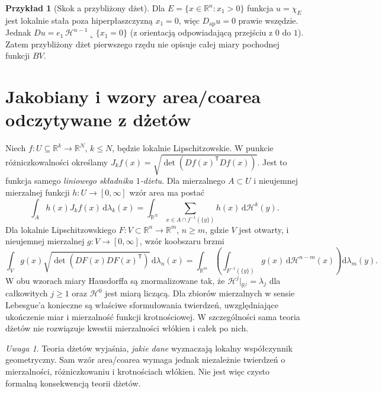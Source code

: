 \documentclass[11pt,a4paper,oneside]{book}
\numberwithin{equation}{chapter}
\theoremstyle{plain}
\theoremstyle{definition}
\newtheorem{przyklad}[twierdzenie]{Przykład}
\theoremstyle{remark}
\newtheorem{uwaga}[twierdzenie]{Uwaga}
\begin{document}
\begin{przyklad}[Skok a przybliżony dżet]
Dla $E=\{x\in\mathbb R^n:x_1>0\}$ funkcja
$u=\chi_E$ jest lokalnie stała poza hiperpłaszczyzną
$x_1=0$, więc $D_{\mathrm{ap}}u=0$ prawie wszędzie.
Jednak $Du=e_1\,\mathcal H^{n-1}\llcorner\{x_1=0\}$
(z orientacją odpowiadającą przejściu z $0$ do $1$).
Zatem przybliżony dżet pierwszego rzędu nie opisuje
całej miary pochodnej funkcji $BV$.
\end{przyklad}

\section{Jakobiany i wzory area/coarea odczytywane z dżetów}
Niech $f:U\subseteq\mathbb R^k\to\mathbb R^N$,
$k\le N$, będzie lokalnie Lipschitzowskie.
W punkcie różniczkowalności określamy
$J_kf(x)=\sqrt{\det(Df(x)^{\mathsf T}Df(x))}$.
Jest to funkcja samego \emph{liniowego składnika $1$-dżetu}.
Dla mierzalnego $A\subset U$ i nieujemnej
mierzalnej funkcji $h:U\to[0,\infty]$ wzór area ma postać
\[
 \int_A h(x)J_kf(x)\,\mathrm d\lambda_k(x)
 =\int_{\mathbb R^N}\sum_{x\in A\cap f^{-1}(\{y\})}
 h(x)\,\mathrm d\mathcal H^k(y).
\]
Dla lokalnie Lipschitzowskiego $F:V\subset\mathbb R^n\to
\mathbb R^m$, $n\ge m$, gdzie $V$ jest otwarty,
i nieujemnej mierzalnej $g:V\to[0,\infty]$, wzór
koobszaru brzmi
\[
 \int_V g(x)\sqrt{\det(DF(x)DF(x)^{\mathsf T})}
 \,\mathrm d\lambda_n(x)
 =\int_{\mathbb R^m}\left(
 \int_{F^{-1}(\{y\})}g(x)\,\mathrm d\mathcal H^{n-m}(x)
 \right)\mathrm d\lambda_m(y).
\]
W obu wzorach miary Hausdorffa są znormalizowane tak,
że $\mathcal H^j|_{\mathbb R^j}=\lambda_j$ dla całkowitych
$j\ge1$ oraz $\mathcal H^0$ jest miarą liczącą.
Dla zbiorów mierzalnych w sensie Lebesgue'a konieczne
są właściwe sformułowania twierdzeń, uwzględniające
ukończenie miar i mierzalność funkcji krotnościowej.
W szczególności sama teoria dżetów nie rozwiązuje
kwestii mierzalności włókien i całek po nich.

\begin{uwaga}
Teoria dżetów wyjaśnia, \emph{jakie dane} wyznaczają
lokalny współczynnik geometryczny. Sam wzór area/coarea
wymaga jednak niezależnie twierdzeń o mierzalności,
różniczkowaniu i krotnościach włókien. Nie jest więc
czysto formalną konsekwencją teorii dżetów.
\end{uwaga}
\end{document}
